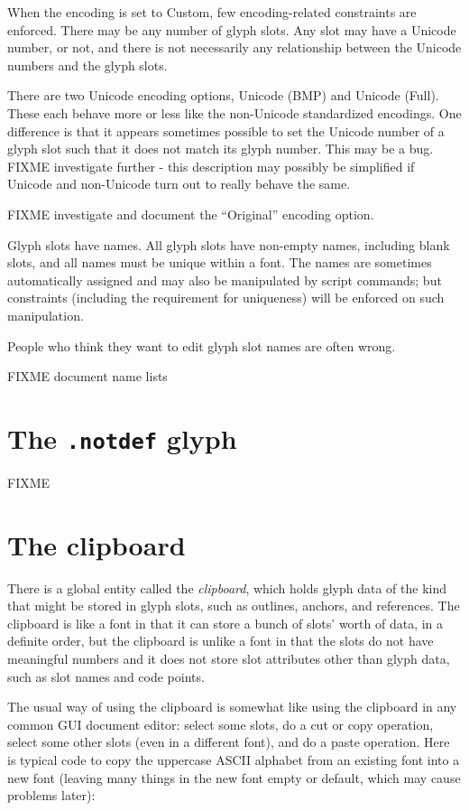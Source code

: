 When the encoding is set to Custom, few encoding-related constraints are
enforced.  There may be any number of glyph slots.  Any slot may have a
Unicode number, or not, and there is not necessarily any relationship
between the Unicode numbers and the glyph slots.

There are two Unicode encoding options, Unicode (BMP) and Unicode (Full). 
These each behave more or less like the non-Unicode standardized encodings. 
One difference is that it appears sometimes possible to set the Unicode
number of a glyph slot such that it does not match its glyph number.  This
may be a bug.  FIXME investigate further - this description may possibly be
simplified if Unicode and non-Unicode turn out to really behave the same.

FIXME investigate and document the ``Original'' encoding option.

Glyph slots have names.  All glyph slots have non-empty names, including
blank slots, and all names must be unique within a font.  The names are
sometimes automatically assigned and may also be manipulated by script
commands; but constraints (including the requirement for uniqueness) will be
enforced on such manipulation.

\begin{framed}
People who think they want to edit glyph slot names are often wrong.
\end{framed}

FIXME document name lists

\section{The \texttt{.notdef} glyph}

FIXME

\section{The clipboard}

There is a global entity called the \emph{clipboard}, which holds glyph data
of the kind that might be stored in glyph slots, such as outlines, anchors,
and references.  The clipboard is like a font in that it can store a bunch
of slots' worth of data, in a definite order, but the clipboard is unlike a
font in that the slots do not have meaningful numbers and it does not store
slot attributes other than glyph data, such as slot names and code points. 

The usual way of using the clipboard is somewhat like using the clipboard in
any common GUI document editor: select some slots, do a cut or copy
operation, select some other slots (even in a different font), and do a
paste operation.  Here is typical code to copy the uppercase ASCII alphabet
from an existing font into a new font (leaving many things in the new font
empty or default, which may cause problems later):

